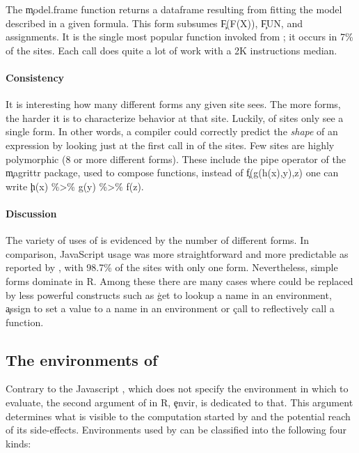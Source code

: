 \documentclass[screen,acmsmall]{acmart}
\begin{document}
\medskip\noindent{} The \c{model.frame} function
returns a dataframe resulting from fitting the model described in a given
formula. This form subsumes \c{F(F(X))}, \c{FUN}, and assignments. It is the
single most popular function invoked from \eval; it occurs in 7\% of the sites.
Each call does quite a lot of work with a 2K instructions median.

\paragraph{Consistency} It is interesting how many different forms any given
site sees. The more forms, the harder it is to characterize behavior at that
site. Luckily, \packageNbOneMinimizedPercent of sites only see a single form.
In other words, a compiler could correctly predict the \emph{shape} of an
expression by looking just at the first call in \packageNbOneMinimizedPercent
of the sites. Few sites are highly polymorphic (8 or more different forms).
These include the pipe operator of the \c{magrittr} package, used to compose
functions, \eg instead of \c{f(g(h(x),y),z)} one can write \c{h(x) \%>\% g(y) \%>\%
f(z)}.

\paragraph{Discussion} The variety of uses of \eval is evidenced by the number
of different forms. In comparison, JavaScript \eval usage was more
straightforward and more predictable as reported by \citet{oopsla12b}, with
98.7\% of the sites with only one form. Nevertheless, simple forms dominate
in R. Among these there are many cases where \eval could be replaced by less
powerful constructs such as \c{get} to lookup a name in an environment,
\c{assign} to set a value to a name in an environment or \c{call} to
reflectively call a function.

\subsection{The environments of \eval}\label{sec:env}

Contrary to the Javascript \eval, which does not specify the environment in
which to evaluate, the second argument of \eval in R, \c{envir}, is dedicated to
that. This argument determines what is visible to the computation started by
\eval and the potential reach of its side-effects. Environments used by \eval
can be classified into the following four kinds:
\end{document}
